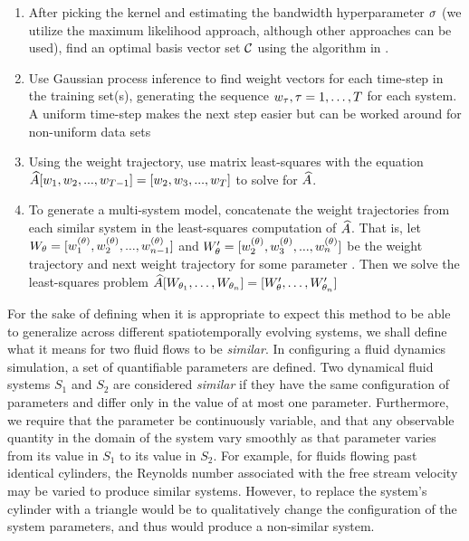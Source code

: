 \begin{enumerate}
	\item After picking the kernel and estimating the bandwidth hyperparameter $\sigma$ (we utilize the maximum likelihood approach, although other approaches can be used), find an optimal basis vector set $\mathcal{C}$ using the algorithm in \cite{csato2002sparse}.
	\item Use Gaussian process inference to find weight vectors for each time-step in the training set(s), generating the sequence $w_\tau, \tau=1,\dots,T$ for each system. A uniform time-step makes the next step easier but can be worked around for non-uniform data sets
	\item Using the weight trajectory, use matrix least-squares with the equation $\widehat{A} [w_1,w_2, ...,w_{T-1}] = [w_2,w_3,...,w_T]$ to solve for $\widehat{A}$.
	\item To generate a multi-system model, concatenate the weight trajectories from each similar system in the least-squares computation of $\widehat{A}$. That is, let $W_{\theta} = [w_1^{(\theta)},w_2^{(\theta)}, ...,w_{n-1}^{(\theta)}]$ and $W_{\theta}' = [w_2^{(\theta)},w_3^{(\theta)}, ...,w_n^{(\theta)}]$ be the weight trajectory and next weight trajectory for some parameter . Then we solve the least-squares problem $\widehat{A} [W_{\theta_1},\dots,W_{\theta_n}] = [W_{\theta}',\dots,W_{\theta_n}']$
\end{enumerate}

For the sake of defining when it is appropriate to expect this method to be able to generalize across different spatiotemporally evolving systems, we shall define what it means for two fluid flows to be \emph{similar}. In configuring a fluid dynamics simulation, a set of quantifiable parameters are defined. Two dynamical fluid systems $S_1$ and $S_2$ are considered \emph{similar} if they have  the same configuration of parameters and differ only in the value of at most one parameter. Furthermore, we require that the parameter be continuously variable, and that any observable quantity in the domain of the system vary smoothly as that parameter varies from its value in $S_1$ to its value in $S_2$. For example, for fluids flowing past identical cylinders, the Reynolds number associated with the free stream velocity may be varied to produce similar systems. However, to replace the system's cylinder with a triangle would be to qualitatively change the configuration of the system parameters, and thus would produce a non-similar system.

